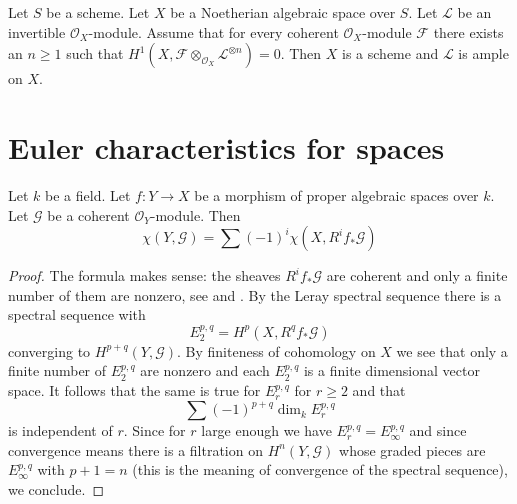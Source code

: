 \begin{lemma}
\label{lemma-Noetherian-h1-zero-invertible}
Let $S$ be a scheme. Let $X$ be a Noetherian algebraic space over $S$.
Let $\mathcal{L}$ be an invertible $\mathcal{O}_X$-module.
Assume that for every coherent $\mathcal{O}_X$-module
$\mathcal{F}$ there exists an $n \geq 1$ such that
$H^1(X, \mathcal{F} \otimes_{\mathcal{O}_X} \mathcal{L}^{\otimes n}) = 0$.
Then $X$ is a scheme and $\mathcal{L}$ is ample on $X$.
\end{lemma}

\section{Euler characteristics for spaces}
\begin{lemma}
\label{lemma-euler-characteristic-morphism}
Let $k$ be a field. Let $f : Y \to X$ be a morphism of proper algebraic spaces
over $k$. Let $\mathcal{G}$ be a coherent $\mathcal{O}_Y$-module. Then
$$
\chi(Y, \mathcal{G}) = \sum (-1)^i \chi(X, R^if_*\mathcal{G})
$$
\end{lemma}

\begin{proof}
The formula makes sense: the sheaves $R^if_*\mathcal{G}$ are coherent
and only a finite number of them are nonzero, see
\cite[\href{http://stacks.math.columbia.edu/tag/08AR}{Tag 08AR}]{stacks-project}
and \cite[\href{http://stacks.math.columbia.edu/tag/073G}{Tag
073G}]{stacks-project}. By the Leray spectral sequence
\cite[\href{http://stacks.math.columbia.edu/tag/0732}{Tag 0732}]{stacks-project}
there is a spectral
sequence with
$$
E_2^{p, q} = H^p(X, R^qf_*\mathcal{G})
$$
converging to $H^{p + q}(Y, \mathcal{G})$. By finiteness of cohomology
on $X$ we see that only a finite number of $E_2^{p, q}$ are nonzero
and each $E_2^{p, q}$ is a finite dimensional vector space. It follows
that the same is true for $E_r^{p, q}$ for $r \geq 2$ and that
$$
\sum (-1)^{p + q} \dim_k E_r^{p, q}
$$
is independent of $r$. Since for $r$ large enough we have
$E_r^{p, q} = E_\infty^{p, q}$ and since convergence means there
is a filtration on $H^n(Y, \mathcal{G})$ whose graded pieces are
$E_\infty^{p, q}$ with $p + 1 = n$ (this is the meaning of convergence
of the spectral sequence), we conclude.
\end{proof}

